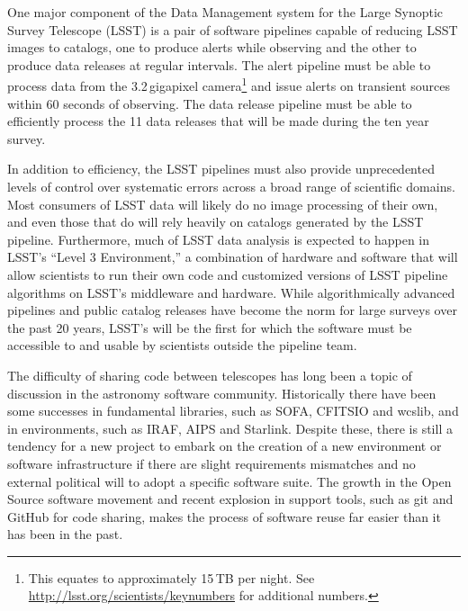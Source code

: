 \documentclass[]{spie}  %
\begin{document}
One major component of the Data Management system\cite{2016_adassxxv_O3-1} for the Large Synoptic Survey Telescope (LSST)\cite{2008arXiv0805.2366I,2016SPIE-Kahn,2014SPIE.9145E..1AG} is a pair of software pipelines capable of reducing LSST images to catalogs, one to produce alerts while observing and the other to produce data releases at regular intervals.
The alert pipeline must be able to process data from the 3.2\,gigapixel camera\footnote{This equates to approximately 15\,TB per night. See \url{http://lsst.org/scientists/keynumbers} for additional numbers.} and issue alerts on transient sources within 60 seconds of observing\cite{2014htu..conf...19K}.
The data release pipeline must be able to efficiently process the 11 data releases that will be made during the ten year survey.

In addition to efficiency, the LSST pipelines must also provide unprecedented levels of control over systematic errors across a broad range of scientific domains.
Most consumers of LSST data will likely do no image processing of their own, and even those that do will rely heavily on catalogs generated by the LSST pipeline.
Furthermore, much of LSST data analysis is expected to happen in LSST's ``Level 3 Environment,'' a combination of hardware and software that will allow scientists to run their own code and customized versions of LSST pipeline algorithms on LSST's middleware and hardware.
While algorithmically advanced pipelines and public catalog releases have become the norm for large surveys over the past 20 years, LSST's will be the first for which the software must be accessible to and usable by scientists outside the pipeline team.

The difficulty of sharing code between telescopes has long been a topic of discussion in the astronomy software community\cite{1998ASPC..145..142M,1999ASPC..172...11E,2001ASSL..266..163S,2002SPIE.4844..321E}.
Historically there have been some successes in fundamental libraries, such as SOFA\cite{2011SchpJ...611404H}, CFITSIO\cite{1999ASPC..172..487P} and wcslib\cite{2011ascl.soft08003C}, and in environments, such as IRAF\cite{1986SPIE..627..733T}, AIPS\cite{1996ASPC..101...37V} and Starlink\cite{1982QJRAS..23..485D}.
Despite these, there is still a tendency for a new project to embark on the creation of a new environment or software infrastructure if there are slight requirements mismatches and no external political will to adopt a specific software suite.
The growth in the Open Source software movement\cite{2006OpenSources} and recent explosion in support tools, such as git and GitHub for code sharing\cite{2014IACWSLima}, makes the process of software reuse far easier than it has been in the past.
\end{document}

